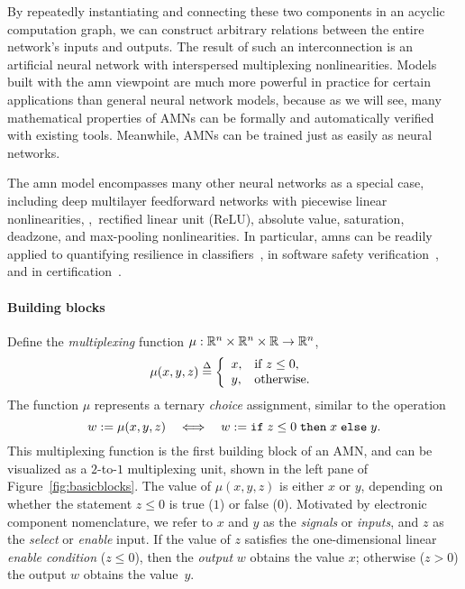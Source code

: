\documentclass[10pt]{article}
\theoremstyle{remark}
\theoremstyle{definition}
\theoremstyle{plain}
\begin{document}
By repeatedly instantiating and connecting these two components in an acyclic
computation graph, we can construct arbitrary relations between the
entire network's inputs and outputs.  The result of such an interconnection is
an artificial neural network with interspersed multiplexing
nonlinearities. Models built with the \acs{amn} viewpoint are much more
powerful in practice for certain applications than general neural network models, because
as we will see, many mathematical properties of AMNs can be formally and
automatically verified with existing tools. Meanwhile, AMNs can be trained just
as easily as neural networks.

The \acs{amn} model encompasses many other neural networks as a special case,
including deep multilayer feedforward networks with
piecewise linear nonlinearities, \eg,~rectified linear unit (ReLU), absolute
value, saturation, deadzone, and max-pooling nonlinearities. In particular,
\acsp{amn} can be readily applied to quantifying 
resilience in classifiers~\cite{Cheng:2017}, in software
safety verification~\cite{Huang:2017,Ehlers:2017}, and in
certification~\cite{Katz:2017}.

\paragraph{Building blocks}
Define the \emph{multiplexing} function $\mu:\mathbb{R}^n \times \mathbb{R}^n \times
\mathbb{R} \to \mathbb{R}^n$, 
\begin{equation}
	\label{eq:mu}
	\mu(x,y,z) \mathrel{\stackrel{\Delta}{=}} \left\{
		\begin{array}{ll}
			x, & \text{if}~z\leq 0,\\
			y, & \text{otherwise}.
		\end{array}
	\right.
\end{equation}
The function $\mu$ represents a ternary \emph{choice} assignment, similar to the
operation
\[
	w := \mu(x,y,z) 
	\quad\Longleftrightarrow\quad
	w := \mbox{\tt if}\; z\leq 0\; \mbox{\tt then}\; x\; \mbox{\tt else}\; y.
\]
This multiplexing function is the first building block of an AMN, and 
can be visualized as a $2$-to-$1$ multiplexing unit, shown
in the left pane of
Figure~\ref{fig:basicblocks}. The value of $\mu(x,y,z)$ is either
$x$ or $y$, depending on whether the statement $z \leq 0$ is true ($1$)
or false ($0$).  Motivated by electronic component nomenclature, we refer
to $x$ and $y$ as the \emph{signals} or \emph{inputs}, and $z$ as the
\emph{select} or \emph{enable} input. If the value of $z$ satisfies the
one-dimensional linear \emph{enable condition} ($z\leq 0$), then the
\emph{output} $w$ obtains the value $x$; otherwise ($z > 0$) the output $w$
obtains the value~$y$.
\end{document}

